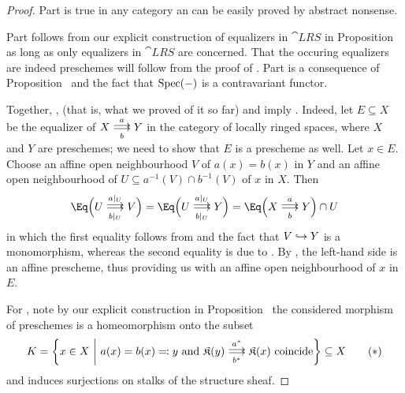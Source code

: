 \documentclass[a4paper,parskip=half,numbers=enddot, DIV=12]{scrreprt}
\begin{document}
\begin{proof}
	Part  is true in any category an can be easily proved by abstract nonsense.
	
	Part  follows from our explicit construction of equalizers in $\cat{LRS}$ in Proposition~ as long as only equalizers in $\cat{LRS}$ are concerned. That the occuring equalizers are indeed preschemes will follow from the proof of . Part  is a consequence of Proposition~ and the fact that $\operatorname{Spec}(-)$ is a contravariant functor. 
	
	Together, ,  (that is, what we proved of it so far) and  imply . Indeed, let $E\subseteq X$ be the equalizer of $X\doublemorphism[a][b]Y$ in the category of locally ringed spaces, where $X$ and $Y$ are preschemes; we need to show that $E$ is a prescheme as well. Let $x\in E$. Choose an affine open neighbourhood $V$ of $a(x)=b(x)$ in $Y$ and an affine open neighbourhood of $U\subseteq a^{-1}(V)\cap b^{-1}(V)$ of $x$ in $X$. Then 
	\begin{align*}
		\Eq\Big(U\doublemorphism[a|_U][b|_U]V\Big)=\Eq\Big(U\doublemorphism[a|_U][b|_U]Y\Big)=\Eq\Big(X\doublemorphism[a][b]Y\Big)\cap U
	\end{align*}
	in which the first equality follows from  and the fact that $V\monomorphism Y$ is a monomorphism, whereas the second equality is due to . By , the left-hand side is an affine prescheme, thus providing us with an affine open neighbourhood of $x$ in $E$.
	
	For , note by our explicit construction in Proposition~ the considered morphism of preschemes is a homeomorphism onto the subset
	\begin{align}\lbl{eq:equalizer1.5}
		K=\left\{x\in X\st a(x)=b(x)\eqqcolon y\text{ and }\KK(y) \doublemorphism[a^*][b^*] \KK(x)\text{ coincide}\right\}\subseteq X\tag{$*$}
	\end{align}
	and induces surjections on stalks of the structure sheaf.
\end{proof}
\end{document}
